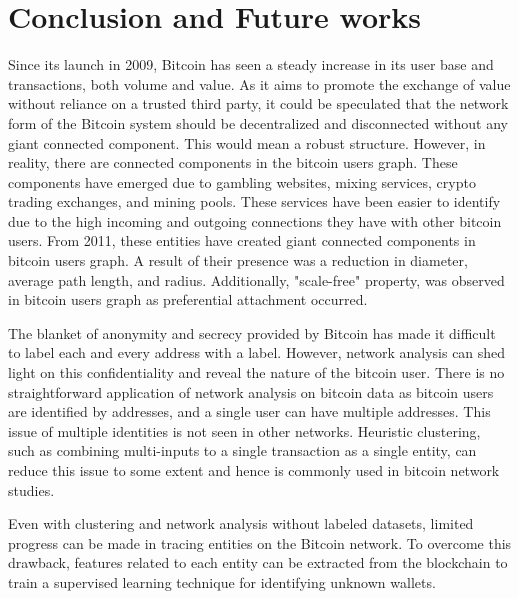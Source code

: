\documentclass[preprint,12pt]{elsarticle}
\begin{document}
\section{Conclusion and Future works} \label{conc}
Since its launch in 2009, Bitcoin has seen a steady increase in its user base and transactions, both volume and value. As it aims to promote the exchange of value without reliance on a trusted third party, it could be speculated that the network form of the Bitcoin system should be decentralized and disconnected without any giant connected component. This would mean a robust structure. However, in reality, there are connected components in the bitcoin users graph. These components have emerged due to gambling websites, mixing services, crypto trading exchanges, and mining pools. These services have been easier to identify due to the high incoming and outgoing connections they have with other bitcoin users. From 2011, these entities have created giant connected components in bitcoin users graph. A result of their presence was a reduction in diameter, average path length, and radius. Additionally, "scale-free" property, was observed in bitcoin users graph as preferential attachment occurred. 

The blanket of anonymity and secrecy provided by Bitcoin has made it difficult to label each and every address with a label. However, network analysis can shed light on this confidentiality and reveal the nature of the bitcoin user. There is no straightforward application of network analysis on bitcoin data as bitcoin users are identified by addresses, and a single user can have multiple addresses. This issue of multiple identities is not seen in other networks. Heuristic clustering, such as combining multi-inputs to a single transaction as a single entity, can reduce this issue to some extent and hence is commonly used in bitcoin network studies. 

Even with clustering and network analysis without labeled datasets, limited progress can be made in tracing entities on the Bitcoin network. To overcome this drawback, features related to each entity can be extracted from the blockchain to train a supervised learning technique for identifying unknown wallets. 
\end{document}
